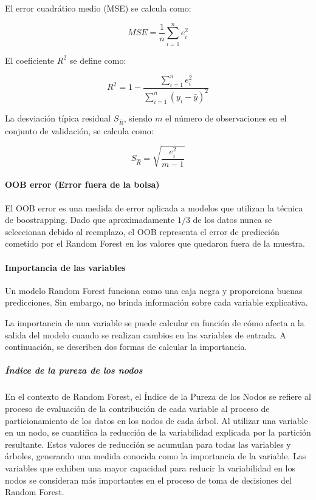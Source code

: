 El error cuadrático medio (MSE) se calcula como:

\[ MSE = \frac{1}{n} \sum_{i=1}^{n} e_i^2 \]

El coeficiente \(R^2\) se define como:

\[ R^2 = 1 - \frac{\sum_{i=1}^{n} e_i^2}{\sum_{i=1}^{n} (y_i - \bar{y})^2} \]

La desviación típica residual \(S_{\hat{R}}\), siendo \(m\) el número de observaciones en el conjunto de validación, se calcula como:

\[ S_{\hat{R}} = \sqrt{\frac{e_i^2}{m-1}} \]

\paragraph{OOB error (Error fuera de la bolsa)}\label{sec:oob}

El OOB error es una medida de error aplicada a modelos que utilizan la técnica de boostrapping. Dado que aproximadamente \(1/3\) de los datos nunca se seleccionan debido al reemplazo, el OOB representa el error de predicción cometido por el Random Forest en los valores que quedaron fuera de la muestra.

\paragraph{Importancia de las variables}\label{sec:importancia-variables}

Un modelo Random Forest funciona como una caja negra y proporciona buenas predicciones. Sin embargo, no brinda información sobre cada variable explicativa.

La importancia de una variable se puede calcular en función de cómo afecta a la salida del modelo cuando se realizan cambios en las variables de entrada. A continuación, se describen dos formas de calcular la importancia.

\subparagraph{Índice de la pureza de los nodos}

En el contexto de Random Forest, el Índice de la Pureza de los Nodos se refiere al proceso de evaluación de la contribución de cada variable al proceso de particionamiento de los datos en los nodos de cada árbol. Al utilizar una variable en un nodo, se cuantifica la reducción de la variabilidad explicada por la partición resultante. Estos valores de reducción se acumulan para todas las variables y árboles, generando una medida conocida como la importancia de la variable. Las variables que exhiben una mayor capacidad para reducir la variabilidad en los nodos se consideran más importantes en el proceso de toma de decisiones del Random Forest.

